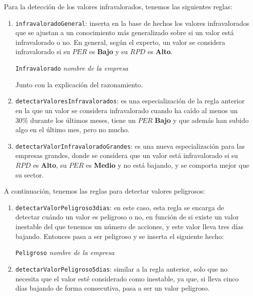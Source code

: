 \documentclass[10pt,spanish]{article}
\theoremstyle{plain}
\theoremstyle{definition}
\begin{document}
Para la detección de los valores infravalorados, tenemos las siguientes reglas:

\begin{enumerate}[---]
    \item \texttt{infravaloradoGeneral}: inserta en la base de hechos los valores infravalorados que se ajustan a un conocimiento más generalizado sobre si un valor está infravalorado o no. En general, según el experto, un valor se considera infravalorado si su $PER$ es \textbf{Bajo} y su $RPD$ es \textbf{Alto}.
    \begin{center}
        \texttt{Infravalorado} \textit{nombre de la empresa}
    \end{center}
    Junto con la explicación del razonamiento.
    \item \texttt{detectarValoresInfravalorados}: es una especialización de la regla anterior en la que un valor se considera infravalorado cuando ha caído al menos un 30\% durante los últimos meses, tiene un $PER$ \textbf{Bajo} y que además han subido algo en el último mes, pero no mucho. 
    \item \texttt{detectarValorInfravaloradoGrandes}: es una nueva especialización para las empresas grandes, donde se considera que un valor está infravalorado si su $RPD$ es \textbf{Alto}, su $PER$ es \textbf{Medio} y no está bajando, y se comporta mejor que su sector.
\end{enumerate}

A continuación, tenemos las reglas para detectar valores peligrosos:

\begin{enumerate}[---]
    \item \texttt{detectarValorPeligroso3dias}: en este caso, esta regla se encarga de detectar cuándo un valor es peligroso o no, en función de si existe un valor inestable del que tenemos un número de acciones, y este valor lleva tres días bajando. Entonces pasa a ser peligroso y se inserta el siguiente hecho:
    \begin{center}
        \texttt{Peligroso} \textit{nombre de la empresa}
    \end{center}

    \item \texttt{detectarValorPeligroso5dias}: similar a la regla anterior, solo que no necesita que el valor esté considerado como inestable, ya que, si lleva cinco días bajando de forma consecutiva, pasa a ser un valor peligroso.
\end{enumerate}
\end{document}
